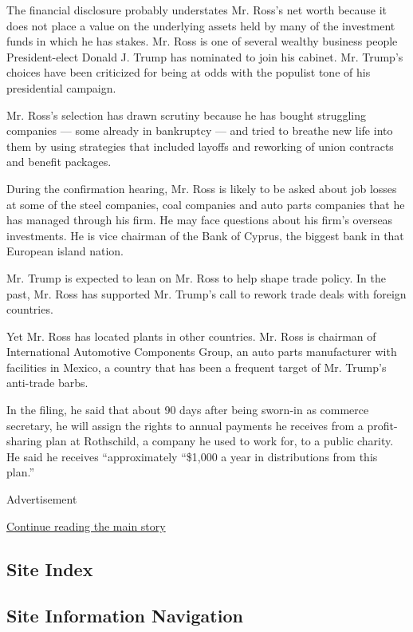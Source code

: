 The financial disclosure probably understates Mr. Ross's net worth
because it does not place a value on the underlying assets held by many
of the investment funds in which he has stakes. Mr. Ross is one of
several wealthy business people President-elect Donald J. Trump has
nominated to join his cabinet. Mr. Trump's choices have been criticized
for being at odds with the populist tone of his presidential campaign.

Mr. Ross's selection has drawn scrutiny because he has bought struggling
companies --- some already in bankruptcy --- and tried to breathe new
life into them by using strategies that included layoffs and reworking
of union contracts and benefit packages.

During the confirmation hearing, Mr. Ross is likely to be asked about
job losses at some of the steel companies, coal companies and auto parts
companies that he has managed through his firm. He may face questions
about his firm's overseas investments. He is vice chairman of the Bank
of Cyprus, the biggest bank in that European island nation.

Mr. Trump is expected to lean on Mr. Ross to help shape trade policy. In
the past, Mr. Ross has supported Mr. Trump's call to rework trade deals
with foreign countries.

Yet Mr. Ross has located plants in other countries. Mr. Ross is chairman
of International Automotive Components Group, an auto parts manufacturer
with facilities in Mexico, a country that has been a frequent target of
Mr. Trump's anti-trade barbs.

In the filing, he said that about 90 days after being sworn-in as
commerce secretary, he will assign the rights to annual payments he
receives from a profit-sharing plan at Rothschild, a company he used to
work for, to a public charity. He said he receives ``approximately
``\$1,000 a year in distributions from this plan.''

Advertisement

\protect\hyperlink{after-bottom}{Continue reading the main story}

\hypertarget{site-index}{%
\subsection{Site Index}\label{site-index}}

\hypertarget{site-information-navigation}{%
\subsection{Site Information
Navigation}\label{site-information-navigation}}

